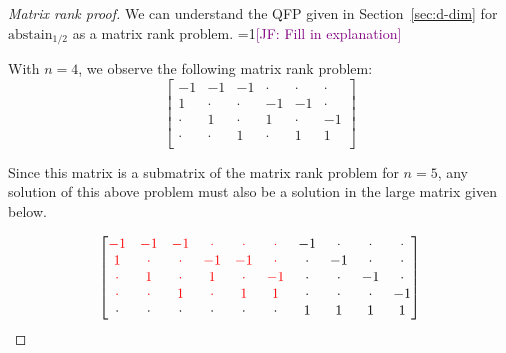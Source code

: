 \documentclass[anon]{colt2020} %
\newcommand{\Comments}{1}
\newcommand{\mynote}[2]{\ifnum\Comments=1\textcolor{#1}{#2}\fi}
\newcommand{\jessie}[1]{\mynote{purple}{[JF: #1]}}
\newcommand{\abstain}[1]{\mathrm{abstain}_{#1}}
\begin{document}
\begin{proof}[Matrix rank proof]
  We can understand the QFP given in Section~\ref{sec:d-dim} for $\abstain{1/2}$ as a matrix rank problem.
  \jessie{Fill in explanation}

  With $n=4$, we observe the following matrix rank problem:
  \[
  \begin{bmatrix}
  	-1 & -1 & -1 & \cdot & \cdot & \cdot \\
  	1 & \cdot & \cdot & -1 & -1 & \cdot \\
  	\cdot & 1 & \cdot & 1 & \cdot & -1 \\
  	\cdot & \cdot & 1 & \cdot & 1 & 1 \\
  \end{bmatrix}
  \]

  Since this matrix is a submatrix of the matrix rank problem for $n=5$, any solution of this above problem must also be a solution in the large matrix given below.

  \[
  \begin{bmatrix}
  {\color{red} -1} & {\color{red} -1} & {\color{red} -1} & {\color{red} \cdot} & {\color{red} \cdot} & {\color{red} \cdot} & -1 & \cdot & \cdot & \cdot \\
  {\color{red} 1} & {\color{red} \cdot} & {\color{red} \cdot} & {\color{red} -1} & {\color{red} -1} & {\color{red} \cdot} & \cdot & -1 & \cdot & \cdot \\
  {\color{red} \cdot} & {\color{red} 1} & {\color{red} \cdot} & {\color{red} 1} & {\color{red} \cdot} & {\color{red} -1} & \cdot & \cdot & -1 & \cdot \\
  {\color{red} \cdot} & {\color{red} \cdot} & {\color{red} 1} & {\color{red} \cdot} & {\color{red} 1} & {\color{red} 1} & \cdot & \cdot & \cdot & -1 \\
  \cdot & \cdot & \cdot & \cdot & \cdot & \cdot & 1 & 1 & 1 & 1\\
  \end{bmatrix}
  \]


\end{proof}
\end{document}
